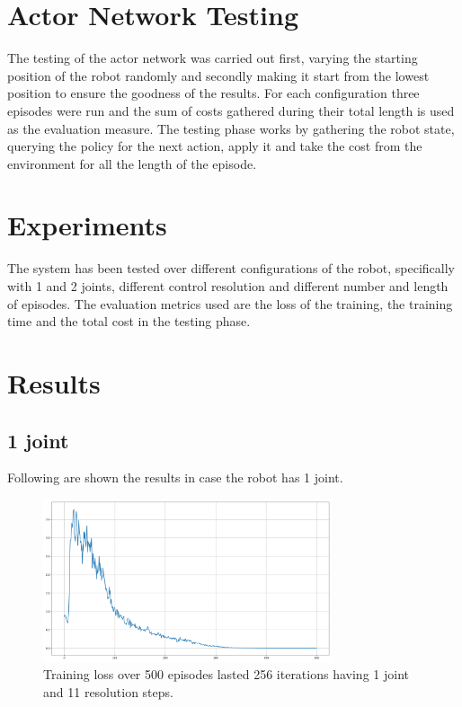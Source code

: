 \documentclass[twocolumn, a4paper]{article}
\begin{document}
\section{Actor Network Testing}
The testing of the actor network was carried out first, varying the starting
position of the robot randomly and secondly making it start from the lowest
position to ensure the goodness of the results.
For each configuration three episodes were run and the sum of costs gathered
during their total length is used as the evaluation measure.
The testing phase works by gathering the robot state, querying the policy
for the next action, apply it and take the cost from the environment for all
the length of the episode.

\section{Experiments}
The system has been tested over different configurations of the robot,
specifically with 1 and 2 joints, different control resolution and
different number and length of episodes.
The evaluation metrics used are the loss of the training, the training time
and the total cost in the testing phase.

\section{Results}
\subsection{1 joint}
Following are shown the results in case the robot has 1 joint.

\label{fig:TrainLoss_1_500_11}
\begin{figure}[H]
	\centering
	\includegraphics[width=8.5cm]{"../Figures/training_loss_1J_500E_256EL_11RES.png"}
	\caption{Training loss over 500 episodes lasted 256 iterations having 1
			 joint and 11 resolution steps.}
\end{figure}
\vspace{-1cm}
\end{document}

